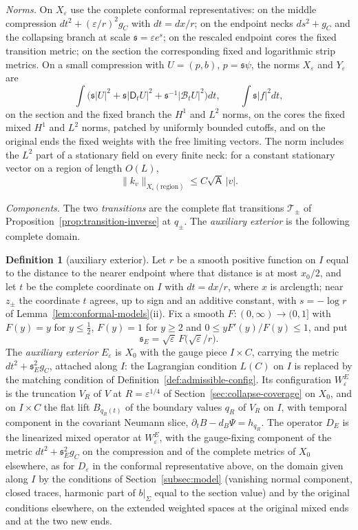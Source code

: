 \documentclass[11pt]{amsart}
\theoremstyle{definition}
\newtheorem{definition}[theorem]{Definition}
\theoremstyle{remark}
\theoremstyle{plain}
\numberwithin{equation}{section}
\newcommand{\eps}{\varepsilon}
\begin{document}
\emph{Norms.} On $X_\eps$ use the complete conformal representatives: on the
middle compression $dt^2+(\eps/r)^2g_C$ with $dt=dx/r$; on the endpoint necks
$ds^2+g_C$ and the collapsing branch at scale ${\mathfrak s}=\eps e^s$; on the rescaled
endpoint cores the fixed transition metric; on the section the corresponding
fixed and logarithmic strip metrics. On a small compression with $U=(p,b)$,
$p={\mathfrak s}\psi$, the norms $X_\eps$ and $Y_\eps$ are
\[
\int\bigl({\mathfrak s}|U|^2+{\mathfrak s}|\mathsf D_tU|^2+{\mathfrak s}^{-1}|\mathcal B_tU|^2\bigr)dt,
\qquad\int{\mathfrak s}|f|^2dt ,
\]
on the section and the fixed branch the $H^1$ and $L^2$ norms, on the cores
the fixed mixed $H^1$ and $L^2$ norms, patched by uniformly bounded cutoffs,
and on the original ends the fixed weights with the free limiting vectors. The
norm includes the $L^2$ part of a stationary field on every finite neck: for a
constant stationary vector on a region of length $O(L)$,
\begin{equation}\label{eq:stationary-cost}
\|k_v\|_{X_\eps(\text{region})}\le C\sqrt{\mathsf A}\,|v|.
\end{equation}

\emph{Components.} The two \emph{transitions} are the complete flat
transitions $\mathcal T_\pm$ of Proposition~\ref{prop:transition-inverse} at
$q_\pm$. The \emph{auxiliary exterior} is the following complete domain.

\begin{definition}[auxiliary exterior]\label{def:aux-exterior}
Let $r$ be a smooth positive function on $I$ equal to the distance to the
nearer endpoint where that distance is at most $x_0/2$, and let $t$ be the
complete coordinate on $I$ with $dt=dx/r$, where $x$ is arclength; near
$z_\pm$ the coordinate $t$ agrees, up to sign and an additive constant, with
$s=-\log r$ of Lemma~\ref{lem:conformal-models}(ii). Fix a smooth
$F\colon(0,\infty)\to(0,1]$ with $F(y)=y$ for $y\le\frac12$, $F(y)=1$ for
$y\ge2$ and $0\le yF'(y)/F(y)\le1$, and put
\[
{\mathfrak s}_E=\sqrt\eps\,F\bigl(\sqrt\eps/r\bigr).
\]
The \emph{auxiliary exterior} $E_\eps$ is $X_0$ with the gauge piece $I\times C$,
carrying the metric $dt^2+{\mathfrak s}_E^2g_C$, attached along $I$: the Lagrangian
condition $L(C)$ on $I$ is replaced by the matching condition of
Definition~\ref{def:admissible-config}. Its configuration $W^E_\eps$ is the
truncation $V_R$ of $V$ at $R=\eps^{1/4}$ of
Section~\ref{sec:collapse-coverage} on $X_0$, and on $I\times C$ the flat lift
$B_{q_R(t)}$ of the boundary values $q_R$ of $V_R$ on $I$, with temporal
component in the covariant Neumann slice, $\partial_tB-d_B\Psi=h_{\dot q_R}$.
The operator $D_E$ is the linearized mixed operator at $W^E_\eps$, with the gauge-fixing component of the metric $dt^2+{\mathfrak s}_E^2g_C$ on the compression and of the complete
metrics of $X_0$ elsewhere, as for $D_\eps$ in the conformal representative above, on the
domain given along $I$ by the conditions of
Section~\ref{subsec:model} (vanishing normal component, closed traces, harmonic
part of $b|_\Sigma$ equal to the section value) and by the original conditions
elsewhere, on the extended weighted spaces at the original mixed ends and at the two new ends.
\end{definition}
\end{document}
